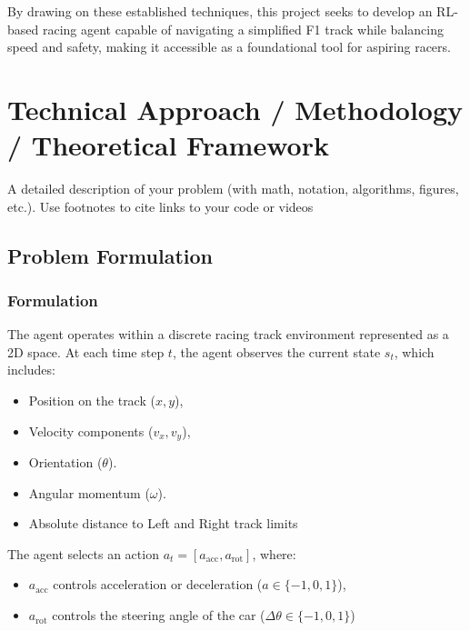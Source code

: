\documentclass{article}
\begin{document}
By drawing on these established techniques, this project seeks to develop an RL-based racing agent capable of navigating a simplified F1 track while balancing speed and safety, making it accessible as a foundational tool for aspiring racers.



\section{Technical Approach / Methodology / Theoretical Framework}



A detailed description of your problem (with math, notation, algorithms, figures, etc.). Use footnotes to cite links to your code or videos


\subsection{Problem Formulation}
\subsubsection{Formulation}

The agent operates within a discrete racing track environment represented as a 2D space. 
At each time step \(t\), the agent observes the current state \(s_t\), which includes:
\begin{itemize}
    \item Position on the track (\(x, y\)),
    \item Velocity components (\(v_x, v_y\)),
    \item Orientation (\(\theta\)).
    \item Angular momentum (\(\omega\)).
    \item Absolute distance to Left and Right track limits
\end{itemize}

The agent selects an action \(a_t = [a_{\text{acc}}, a_{\text{rot}}]\), where:
\begin{itemize}
    \item \(a_{\text{acc}}\) controls acceleration or deceleration (\(a\in\{-1,
      0, 1\}\)),
    \item \(a_{\text{rot}}\) controls the steering angle of the car
      (\(\Delta\theta\in\{-1, 0, 1\}\))
\end{itemize}
\end{document}
